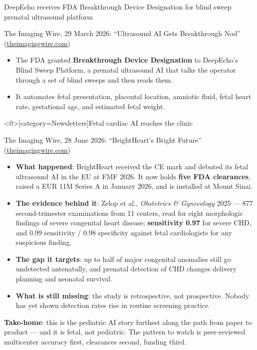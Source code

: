 \documentclass[aspectratio=169]{beamer}
\begin{document}
\begin{frame}[category=Newsletters]{DeepEcho receives FDA Breakthrough Device Designation for blind sweep prenatal ultrasound platform}
\relax
{\scriptsize The Imaging Wire, 29 March 2026: ``Ultrasound AI Gets Breakthrough Nod''
(\href{https://theimagingwire.com/newsletter/mammography-use-falls/}{theimagingwire.com})\par}
\medskip
\small
\begin{itemize}
  \item The FDA granted \textbf{Breakthrough Device Designation} to DeepEcho's Blind Sweep Platform, a prenatal ultrasound AI that talks the operator through a set of blind sweeps and then reads them.
  \item It automates fetal presentation, placental location, amniotic fluid, fetal heart rate, gestational age, and estimated fetal weight.
\end{itemize}
\end{frame}

\begin{frame}<0>[category=Newsletters]{Fetal cardiac AI reaches the clinic}
\relax
{\scriptsize The Imaging Wire, 28 June 2026: ``BrightHeart's Bright Future''
(\href{https://theimagingwire.com/newsletter/interventional-work-changes-heat-wave-melts-mri-and-aidoc-breakthrough/}{theimagingwire.com})\par}
\medskip
\small
\begin{itemize}
  \item \textbf{What happened}: BrightHeart received the CE mark and debuted its fetal ultrasound AI in the EU at FMF 2026. It now holds \textbf{five FDA clearances}, raised a EUR 11M Series A in January 2026, and is installed at Mount Sinai.
  \item \textbf{The evidence behind it}: Zelop et al., \textit{Obstetrics \& Gynecology} 2025 --- 877 second-trimester examinations from 11 centers, read for eight morphologic findings of severe congenital heart disease; \textbf{sensitivity 0.97} for severe CHD, and 0.99 sensitivity / 0.98 specificity against fetal cardiologists for any suspicious finding.
  \item \textbf{The gap it targets}: up to half of major congenital anomalies still go undetected antenatally, and prenatal detection of CHD changes delivery planning and neonatal survival.
  \item \textbf{What is still missing}: the study is retrospective, not prospective. Nobody has yet shown detection rates rise in routine screening practice.
\end{itemize}
\medskip
\textbf{Take-home}: this is the pediatric AI story furthest along the path from paper to product --- and it is fetal, not pediatric. The pattern to watch is peer-reviewed multicenter accuracy first, clearances second, funding third.
\end{frame}
\end{document}
